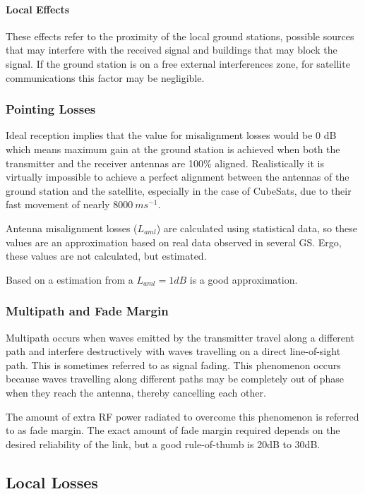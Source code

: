 \paragraph{Local Effects}
These effects refer to the proximity of the local ground stations, possible sources that may interfere with the received signal and buildings that may block the signal. If the ground station is on a free external interferences zone, for satellite communications this factor may be negligible.

\subsubsection{Pointing Losses}
Ideal reception implies that the value for misalignment losses would be 0 dB which means maximum gain at the ground station is achieved when both the transmitter and the receiver antennas are 100\% aligned. Realistically it is virtually impossible to achieve a perfect alignment between the antennas of the ground station and the satellite, especially in the case of CubeSats, due to their fast movement of nearly $8000\ ms^{-1}$.

Antenna misalignment losses ($L_{aml}$) are calculated using statistical data, so these values are an approximation based on real data observed in several GS. Ergo, these values are not calculated, but estimated.\cite{Jorge2012}

Based on a estimation from \cite{Macdonald2014} a $L_{aml}=1dB$ is a good approximation.

\subsubsection{Multipath and Fade Margin}
Multipath occurs when waves emitted by the transmitter travel along a different path and interfere destructively with waves travelling on a direct line-of-sight path. This is sometimes referred to as signal fading. This phenomenon occurs because waves travelling along different paths may be completely out of phase when they reach the antenna, thereby cancelling each other.

The amount of extra RF power radiated to overcome this phenomenon is referred to as fade margin. The exact
amount of fade margin required depends on the desired reliability of the link, but a good rule-of-thumb is 20dB to 30dB.

\subsection{Local Losses}
